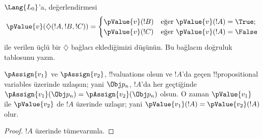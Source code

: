 \documentclass[../../../include/open-logic-section]{subfiles}
\begin{document}
\begin{prob}
$\Lang{L_0}$'a, değerlendirmesi
\begin{gather*}
  \pValue{v}(\diamondsuit( !A , !B , !C ) ) = \begin{cases}
    \pValue{v}( !B ) &
    \text{eğer $\pValue{v}(!A) = \True$;}\\
    \pValue{v}( !C ) &
    \text{eğer $\pValue{v}(!A) = \False $}
  \end{cases}
\end{gather*}
ile verilen üçlü bir $\diamondsuit$ bağlacı eklediğimizi düşünün. Bu bağlacın
doğruluk tablosunu yazın.
\end{prob}

\begin{thm}
 $\pAssign{v_1}$ ve $\pAssign{v_2}$,
!!{valuation}s olsun ve $!A$'da geçen !!{propositional
variable}s üzerinde uzlaşsın; yani $\Obj p_n$, $!A$'da her geçtiğinde
$\pAssign{v_1}(\Obj p_n) = \pAssign{v_2}(\Obj p_n)$ olsun. O zaman
$\pValue{v_1}$ ile $\pValue{v_2}$ de $!A$ üzerinde uzlaşır; yani
$\pValue{v_1}(!A) = \pValue{v_2}(!A)$ olur.
\end{thm}

\begin{proof}
$!A$ üzerinde tümevarımla.
\end{proof}
\end{document}
